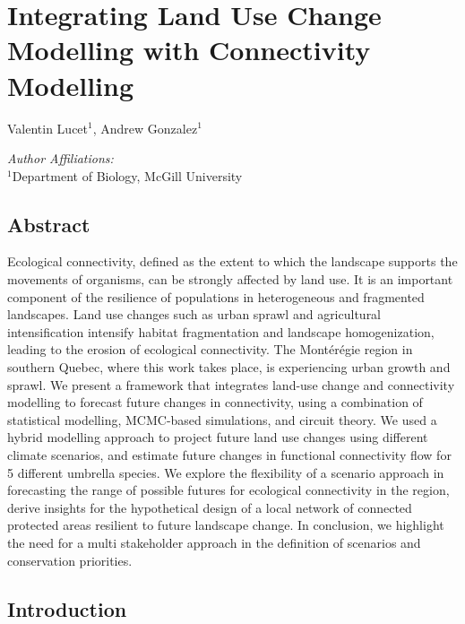 \chapter{Integrating Land Use Change Modelling with Connectivity Modelling}
\begin{center}
{Valentin Lucet$^{1}$, Andrew Gonzalez$^{1}$}\\
\end{center}
\textit{Author Affiliations:}\\
\normalsize{$^{1}$Department of Biology, McGill University}\\
\section{Abstract}

Ecological connectivity, defined as the extent to which the landscape supports the movements of organisms, can be strongly affected by land use. It is an important component of the resilience of populations in heterogeneous and fragmented landscapes. Land use changes such as urban sprawl and agricultural intensification intensify habitat fragmentation and landscape homogenization, leading to the erosion of ecological connectivity. The Montérégie region in southern Quebec, where this work takes place, is experiencing urban growth and sprawl. We present a framework that integrates land-use change and connectivity modelling to forecast future changes in connectivity, using a combination of statistical modelling, MCMC-based simulations, and circuit theory. We used a hybrid modelling approach to project future land use changes using different climate scenarios, and estimate future changes in functional connectivity flow for 5 different umbrella species. We explore the flexibility of a scenario approach in forecasting the range of possible futures for ecological connectivity in the region, derive insights for the hypothetical design of a local network of connected protected areas resilient to future landscape change. In conclusion, we highlight the need for a multi stakeholder approach in the definition of scenarios and conservation priorities.\\

\section{Introduction}
\vspace{2em}

